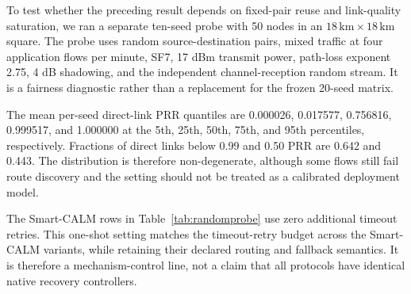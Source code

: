 \documentclass[conference]{IEEEtran}
\begin{document}
To test whether the preceding result depends on fixed-pair reuse and
link-quality saturation, we ran a separate ten-seed probe with 50 nodes in an
$18\,\mathrm{km} \times 18\,\mathrm{km}$ square. The probe uses random
source-destination pairs, mixed traffic at four application flows per minute,
SF7, 17 dBm transmit power, path-loss exponent 2.75, 4 dB shadowing, and the
independent channel-reception random stream. It is a fairness diagnostic rather
than a replacement for the frozen 20-seed matrix.

The mean per-seed direct-link PRR quantiles are 0.000026, 0.017577, 0.756816,
0.999517, and 1.000000 at the 5th, 25th, 50th, 75th, and 95th percentiles,
respectively. Fractions of direct links below 0.99 and 0.50 PRR are 0.642 and
0.443. The distribution is therefore non-degenerate, although some flows still
fail route discovery and the setting should not be treated as a calibrated
deployment model.

The Smart-CALM rows in Table~\ref{tab:randomprobe} use zero additional timeout
retries. This one-shot setting matches the timeout-retry budget across the
Smart-CALM variants, while retaining their declared routing and fallback
semantics. It is therefore a mechanism-control line, not a claim that all
protocols have identical native recovery controllers.

\begin{table}[t]
\centering
\caption{One-shot, budget-matched random-pair, non-saturated multi-hop probe
over 10 seeds. Smart-CALM timeout retries are disabled. Values are means
$\pm$ half-widths of two-sided 95\% confidence intervals. The multi-hop-route
fraction is measured among completed cached routes; it is not defined for
managed flooding.}
\label{tab:randomprobe}
\scriptsize
\setlength{\tabcolsep}{3pt}
\end{table}
\end{document}
